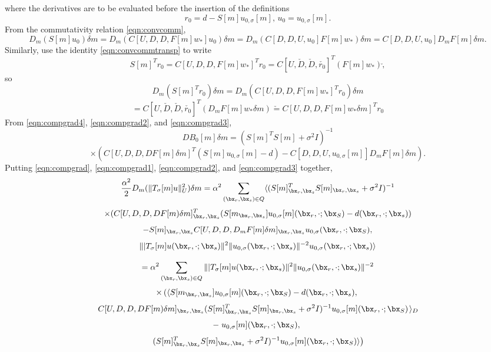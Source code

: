where the derivatives are to be evaluated before the insertion of the definitions 
$$
r_0 = d -S[m]u_{0,\sigma}[m], \, u_0 = u_{0,\sigma}[m].
$$
From the commutativity relation \ref{eqn:convcomm},
\begin{equation}
  \label{eqn:compgrad2}
D_m(S[m]u_0)\delta m = D_m(C[U,D,D,F[m]w_*]u_0)\delta m = D_m(C[D,D,U,u_0]F[m]w_*)\delta m
=C[D,D,U,u_0]D_mF[m]\delta m.
\end{equation}
Similarly, use the identity \ref{eqn:convcommtransp} to write
$$
S[m]^Tr_0 = C[U,D,D,F[m]w_*]^Tr_0 = C[U,\check{D},\check{D},\check{r_0}]^T({F[m]w_*})\check, 
$$
so
 \[
  D_m(S[m]^Tr_0)\delta m =  D_m(C[U,D,D,F[m]w_*]^Tr_0)\delta m
\]
\begin{equation} \label{eqn:compgrad3}
  =C[U,\check{D},\check{D},\check{r_0}]^T(D_mF[m]w_* \delta m)\check= C[U,D,D,F[m]w_*\delta m]^Tr_0
\end{equation}
From \ref{eqn:compgrad4}, \ref{eqn:compgrad2}, and \ref{eqn:compgrad3},
\[
  DB_0[m]\delta m = (S[m]^TS[m] + \sigma^2 I)^{-1}
\]  
\begin{equation}
  \label{eqn:compgrad5}
\times (C[U,D,D,DF[m]\delta m]^T(S[m]u_{0,\sigma}[m]-d) - C[D,D,U,u_{0,\sigma}[m]]D_mF[m]\delta m).
\end{equation}
Putting \ref{eqn:compgrad}, \ref{eqn:compgrad1}, \ref{eqn:compgrad2},
and \ref{eqn:compgrad3} together,
\[
  \frac{\alpha^2}{2} D_m(\|T_{\sigma}[m]u\|_U^2)\delta m 
  =\alpha^2 \sum_{(\bx_r,\bx_s) \in Q} \langle  (S[m]_{\bx_r,\bx_s}^TS[m]_{\bx_r,\bx_s} + \sigma^2 I)^{-1}
\]
\[
  \times (C[U,D,D,DF[m)\delta m]_{\bx_r,\bx_s}^T(S[m _{\bx_r,\bx_s}]u_{0,\sigma}[m](\bx_r,\cdot;\bx_S)-d(\bx_r,\cdot;\bx_s))
\]
\[
  - S[m]_{\bx_r,\bx_s} C[U,D,D, D_mF[m]\delta m]_{\bx_r,\bx_s} u_{0,\sigma} (\bx_r,\cdot;\bx_S),
\]
\[
  \||T_{\sigma}[m]u(\bx_r,\cdot;\bx_s)\|^2
  \|u_{0,\sigma}(\bx_r,\cdot;\bx_s)\|^{-2}u_{0,\sigma}(\bx_r,\cdot;\bx_s)\rangle
\]

\[
  = \alpha^2 \sum_{(\bx_r,\bx_s) \in Q} \||T_{\sigma}[m]u(\bx_r,\cdot;\bx_s)\|^2\|u_{0,\sigma}(\bx_r,\cdot;\bx_s)\|^{-2}
\]
\[
  \times \left( \langle S[m _{\bx_r,\bx_s}]u_{0,\sigma}[m](\bx_r,\cdot;\bx_S)-d(\bx_r,\cdot;\bx_s),\right.
\]
\[
  \left. C[U,D,D,DF[m)\delta m]_{\bx_r,\bx_s} (S[m]_{\bx_r,\bx_s}^TS[m]_{\bx_r,\bx_s} + \sigma^2 I)^{-1}u_{0,\sigma}[m](\bx_r,\cdot;\bx_S) \right. \rangle_D
\]
\[
  - \left. u_{0,\sigma}[m](\bx_r,\cdot;\bx_S),\right.
\]
\[
\left. (S[m]_{\bx_r,\bx_s}^TS[m]_{\bx_r,\bx_s} + \sigma^2 I)^{-1}u_{0,\sigma}[m](\bx_r,\cdot;\bx_S) \rangle \right)
\]
